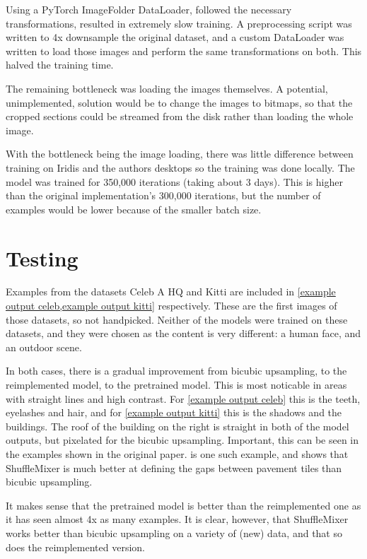 \documentclass{article}
\begin{document}
    Using a PyTorch ImageFolder DataLoader, followed the necessary transformations, resulted in extremely slow training. A preprocessing script was written to 4x downsample the original dataset, and a custom DataLoader was written to load those images and perform the same transformations on both. This halved the training time.

    The remaining bottleneck was loading the images themselves. A potential, unimplemented, solution would be to change the images to bitmaps, so that the cropped sections could be streamed from the disk rather than loading the whole image. 

    With the bottleneck being the image loading, there was little difference between training on Iridis and the authors desktops so the training was done locally. The model was trained for 350,000 iterations (taking about 3 days). This is higher than the original implementation's 300,000 iterations, but the number of examples would be lower because of the smaller batch size. 

    \section{Testing}

    Examples from the datasets Celeb A HQ \citep{liu2015faceattributes} and Kitti \citep{Geiger2012CVPR} are included in \cref{example output celeb,example output kitti} respectively. These are the first images of those datasets, so not handpicked. Neither of the models were trained on these datasets, and they were chosen as the content is very different: a human face, and an outdoor scene.

    In both cases, there is a gradual improvement from bicubic upsampling, to the  reimplemented model, to the pretrained model. This is most noticable in areas with straight lines and high contrast. For \cref{example output celeb} this is the teeth, eyelashes and hair, and for \cref{example output kitti} this is the shadows and the buildings. The roof of the building on the right is straight in both of the model outputs, but pixelated for the bicubic upsampling. Important, this can be seen in the examples shown in the original paper.  is one such example, and shows that ShuffleMixer is much better at defining the gaps between pavement tiles than bicubic upsampling.
    
    It makes sense that the pretrained model is better than the reimplemented one as it has seen almost 4x as many examples. It is clear, however, that ShuffleMixer works better than bicubic upsampling on a variety of (new) data, and that so does the reimplemented version.
\end{document}
